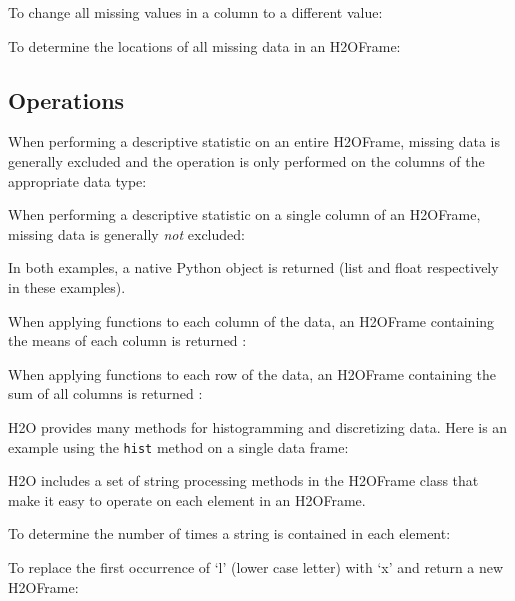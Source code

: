 {To change all missing values in a column to a different value:


\newpage
To determine the locations of all missing data in an H2OFrame:


\subsection{Operations}
When performing a descriptive statistic on an entire H2OFrame, missing data is generally excluded
and the operation is only performed on the columns of the appropriate data type:


\newpage
When performing a descriptive statistic on a single column of an H2OFrame, missing data is generally 
\textit{not} excluded:


In both examples,  a native Python object is returned (list and float respectively
in these examples).

When applying functions to each column of the data, an H2OFrame containing the means of each column is returned :


When applying functions to each row of the data, an H2OFrame containing the sum of all columns is returned :


\newpage
H2O provides many methods for histogramming and discretizing data.
Here is an example using the {\texttt{hist}} method on a single data frame:


H2O includes a set of string processing methods in the H2OFrame class
that make it easy to operate on each element in an H2OFrame.  

To determine the number of times a string is contained in each element:


To replace the first occurrence of `l' (lower case letter) with `x' and return a new H2OFrame:


}
